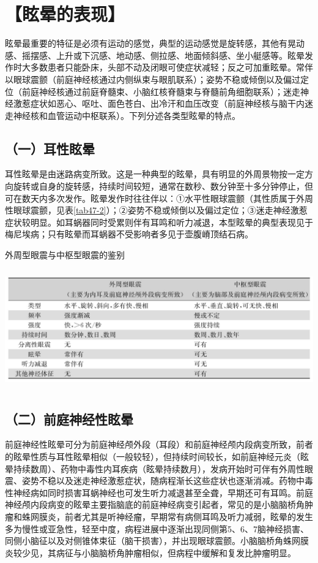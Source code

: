 \section{【眩晕的表现】}

眩晕最重要的特征是必须有运动的感觉，典型的运动感觉是旋转感，其他有晃动感、摇摆感、上升或下沉感、地动感、侧拉感、地面倾斜感、坐小艇感等。眩晕发作时大多数患者只能卧床，头部不动及闭眼可使症状减轻；反之可加重眩晕。常伴以眼球震颤（前庭神经核通过内侧纵束与眼肌联系）；姿势不稳或倾倒以及偏过定位（前庭神经核通过前庭脊髓束、小脑红核脊髓束与脊髓前角细胞联系）；迷走神经激惹症状如恶心、呕吐、面色苍白、出冷汗和血压改变（前庭神经核与脑干内迷走神经核和血管运动中枢联系）。下列分述各类型眩晕的特点。

\subsection{（一）耳性眩晕}

耳性眩晕是由迷路病变所致。这是一种典型的眩晕，具有明显的外周景物按一定方向旋转或自身的旋转感，持续时间较短，通常在数秒、数分钟至十多分钟停止，但可在数天内多次发作。眩晕发作时往往伴以：①水平性眼球震颤（其性质属于外周性眼球震颤，见表\ref{tab47-2}）；②姿势不稳或倾倒以及偏过定位；③迷走神经激惹症状较明显。如耳蜗器同时受累则伴有耳鸣和听力减退，本型眩晕的典型表现见于梅尼埃病；只有眩晕而耳蜗器不受影响者多见于壶腹嵴顶结石病。

\begin{table}[htbp]
\centering
\caption{外周型眼震与中枢型眼震的鉴别}
\label{tab47-2}
\includegraphics[width=5.94792in,height=2.03125in]{./images/Image00297.jpg}
\end{table}

\subsection{（二）前庭神经性眩晕}

前庭神经性眩晕可分为前庭神经颅外段（耳段）和前庭神经颅内段病变所致，前者的眩晕性质与耳性眩晕相似（一般较轻），但持续时间较长，如前庭神经元炎（眩晕持续数周）、药物中毒性内耳疾病（眩晕持续数月），发病开始时可伴有外周性眼震、姿势不稳以及迷走神经激惹症状，随病程渐长这些症状也逐渐消减。药物中毒性神经病如同时损害耳蜗神经也可发生听力减退甚至全聋，早期还可有耳鸣。前庭神经颅内段病变的眩晕主要指脑底的前庭神经病变引起者，常见的是小脑脑桥角肿瘤和蛛网膜炎，前者尤其是听神经瘤，早期常有病侧耳鸣及听力减弱，眩晕的发生多为慢性或亚急性，轻至中度，病程进展中逐渐出现同侧第5、6、7脑神经损害、同侧小脑征以及对侧锥体束征（脑干损害），并出现眼球震颤。小脑脑桥角蛛网膜炎较少见，其病征与小脑脑桥角肿瘤相似，但病程中缓解和复发比肿瘤明显。

